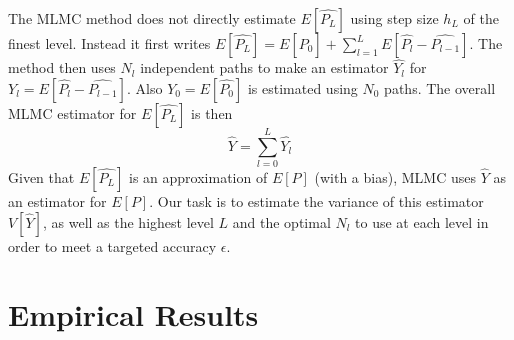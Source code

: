 \documentclass{article}
\begin{document}
	The MLMC method does not directly estimate $E[\widehat{P_L}]$ using step size $h_L$ of the finest level. Instead it first writes $E[\widehat{P_L}] = E[\widehat{P_0}] + \sum_{l=1}^L E[\widehat{P_l} - \widehat{P_{l-1}}]$. The method then uses $N_l$ independent paths to make an estimator $\widehat{Y_l}$ for $Y_l = E[\widehat{P_l} - \widehat{P_{l-1}}]$. Also $Y_0 = E[\widehat{P_0}]$ is estimated using $N_0$ paths. The overall MLMC estimator for $E[\widehat{P_L}]$ is then
	$$\widehat{Y} = \sum_{l=0}^L \widehat{Y_l}$$
	Given that $E[\widehat{P_L}]$ is an approximation of $E[P]$ (with a bias), MLMC uses $\widehat{Y}$ as an estimator for $E[P]$. Our task is to estimate the variance of this estimator $V[\widehat{Y}]$, as well as the highest level $L$ and the optimal $N_l$ to use at each level in order to meet a targeted accuracy $\epsilon$.
		
	
	
\section{Empirical Results}



\end{document}
